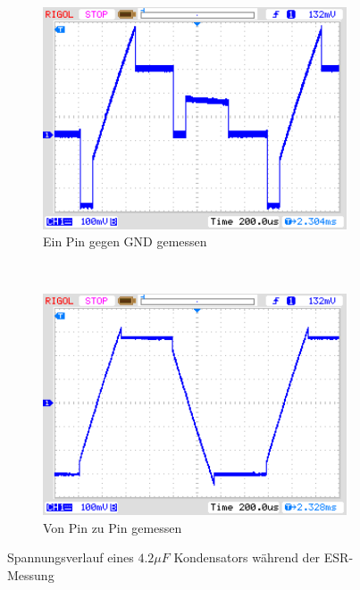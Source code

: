 \begin{figure}[H]
  \begin{subfigure}[b]{9cm}
    \centering
    \includegraphics[width=9cm]{../PNG/ESR_4uF.png}
    \caption{Ein Pin gegen GND gemessen}
  \end{subfigure}
  ~
  \begin{subfigure}[b]{9cm}
    \centering
    \includegraphics[width=9cm]{../PNG/ESR4uF6R8.png}
    \caption{Von Pin zu Pin gemessen}
  \end{subfigure}
  \caption{Spannungsverlauf eines \(4.2\mu F\) Kondensators während der ESR-Messung}
  \label{pic:esr4}
\end{figure}

